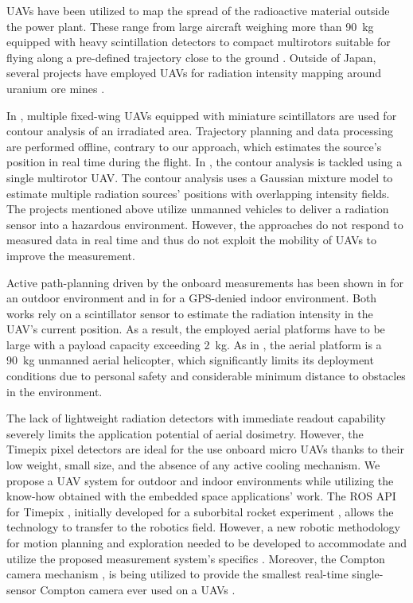\documentclass[a4paper,11pt,twoside,openright]{book}
\begin{document}
\acp{UAV} have been utilized to map the spread of the radioactive material outside the power plant.
These range from large aircraft weighing more than \SI{90}{\kilogram} equipped with heavy scintillation detectors \cite{sanada2015aerial, towler2012radiation, jiang2016prototype}
to compact multirotors suitable for flying along a pre-defined trajectory close to the ground \cite{macfarlane2014lightweight, christie2017radiation, martin20163d}.
Outside of Japan, several projects have employed \acp{UAV} for radiation intensity mapping around uranium ore mines \cite{salek2018mapping, keatley2018source, martin2015use}.

In \cite{han2013lowcost}, multiple fixed-wing \acp{UAV} equipped with miniature scintillators are used for contour analysis of an irradiated area.
Trajectory planning and data processing are performed offline, contrary to our approach, which estimates the source's position in real time during the flight.
In \cite{newaz2016uav}, the contour analysis is tackled using a single multirotor \ac{UAV}. The contour analysis uses a Gaussian mixture model to estimate multiple radiation sources' positions with overlapping intensity fields.
The projects mentioned above utilize unmanned vehicles to deliver a radiation sensor into a hazardous environment.
However, the approaches do not respond to measured data in real time and thus do not exploit the mobility of \acp{UAV} to improve the measurement.

Active path-planning driven by the onboard measurements has been shown in \cite{towler2012radiation} for an outdoor environment and in \cite{mascarich2018radiation} for a GPS-denied indoor environment.
Both works rely on a scintillator sensor to estimate the radiation intensity in the \ac{UAV}'s current position.
As a result, the employed aerial platforms have to be large with a payload capacity exceeding \SI{2}{\kilogram}.
As in \cite{towler2012radiation}, the aerial platform is a \SI{90}{\kilogram} unmanned aerial helicopter, which significantly limits its deployment conditions due to personal safety and considerable minimum distance to obstacles in the environment.

The lack of lightweight radiation detectors with immediate readout capability severely limits the application potential of aerial dosimetry.
However, the Timepix pixel detectors are ideal for the use onboard micro \acp{UAV} thanks to their low weight, small size, and the absence of any active cooling mechanism.
We propose a \ac{UAV} system for outdoor and indoor environments while utilizing the know-how obtained with the embedded space applications' work.
The \ac{ROS} \acs{API} for Timepix \cite{baca2018rospix}, initially developed for a suborbital rocket experiment \cite{urban2020rex}, allows the technology to transfer to the robotics field.
However, a new robotic methodology for motion planning and exploration needed to be developed to accommodate and utilize the proposed measurement system's specifics \cite{stibinger2020localization}.
Moreover, the Compton camera mechanism \cite{turecek2018compton}, is being utilized to provide the smallest real-time single-sensor Compton camera ever used on a \acp{UAV} \cite{baca2020gamma}.
\end{document}
